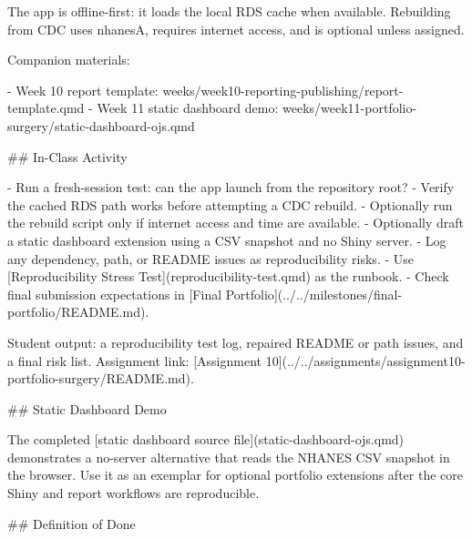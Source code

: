 \documentclass[
  letterpaper,
  DIV=11,
  numbers=noendperiod,
  oneside]{scrreprt}
\newenvironment{Shaded}{\begin{snugshade}}{\end{snugshade}}
\newcommand{\CommentTok}[1]{\textcolor[rgb]{0.37,0.37,0.37}{#1}}
\newcommand{\FunctionTok}[1]{\textcolor[rgb]{0.28,0.35,0.67}{#1}}
\newcommand{\InformationTok}[1]{\textcolor[rgb]{0.37,0.37,0.37}{#1}}
\newcommand{\NormalTok}[1]{\textcolor[rgb]{0.00,0.23,0.31}{#1}}
\newcommand{\OtherTok}[1]{\textcolor[rgb]{0.00,0.23,0.31}{#1}}
\newcommand{\SpecialStringTok}[1]{\textcolor[rgb]{0.13,0.47,0.30}{#1}}
\begin{document}
\begin{Shaded}
\begin{Highlighting}[numbers=left,,]
\NormalTok{The app is offline{-}first: it loads the local RDS cache when available. Rebuilding from CDC uses }\InformationTok{\textasciigrave{}nhanesA\textasciigrave{}}\NormalTok{, requires internet access, and is optional unless assigned.}

\NormalTok{Companion materials:}

\SpecialStringTok{{-} }\NormalTok{Week 10 report template: }\InformationTok{\textasciigrave{}weeks/week10{-}reporting{-}publishing/report{-}template.qmd\textasciigrave{}}
\SpecialStringTok{{-} }\NormalTok{Week 11 static dashboard demo: }\InformationTok{\textasciigrave{}weeks/week11{-}portfolio{-}surgery/static{-}dashboard{-}ojs.qmd\textasciigrave{}}


\FunctionTok{\#\# In{-}Class Activity}

\SpecialStringTok{{-} }\NormalTok{Run a fresh{-}session test: can the app launch from the repository root?}
\SpecialStringTok{{-} }\NormalTok{Verify the cached RDS path works before attempting a CDC rebuild.}
\SpecialStringTok{{-} }\NormalTok{Optionally run the rebuild script only if internet access and time are available.}
\SpecialStringTok{{-} }\NormalTok{Optionally draft a static dashboard extension using a CSV snapshot and no Shiny server.}
\SpecialStringTok{{-} }\NormalTok{Log any dependency, path, or README issues as reproducibility risks.}
\SpecialStringTok{{-} }\NormalTok{Use }\CommentTok{[}\OtherTok{Reproducibility Stress Test}\CommentTok{](reproducibility{-}test.qmd)}\NormalTok{ as the runbook.}
\SpecialStringTok{{-} }\NormalTok{Check final submission expectations in }\CommentTok{[}\OtherTok{Final Portfolio}\CommentTok{](../../milestones/final{-}portfolio/README.md)}\NormalTok{.}

\NormalTok{Student output: a reproducibility test log, repaired README or path issues, and a final risk list. Assignment link: }\CommentTok{[}\OtherTok{Assignment 10}\CommentTok{](../../assignments/assignment10{-}portfolio{-}surgery/README.md)}\NormalTok{.}

\FunctionTok{\#\# Static Dashboard Demo}

\NormalTok{The completed }\CommentTok{[}\OtherTok{static dashboard source file}\CommentTok{](static{-}dashboard{-}ojs.qmd)}\NormalTok{ demonstrates a no{-}server alternative that reads the NHANES CSV snapshot in the browser. Use it as an exemplar for optional portfolio extensions after the core Shiny and report workflows are reproducible.}

\FunctionTok{\#\# Definition of Done}


\end{Highlighting}
\end{Shaded}
\end{document}
